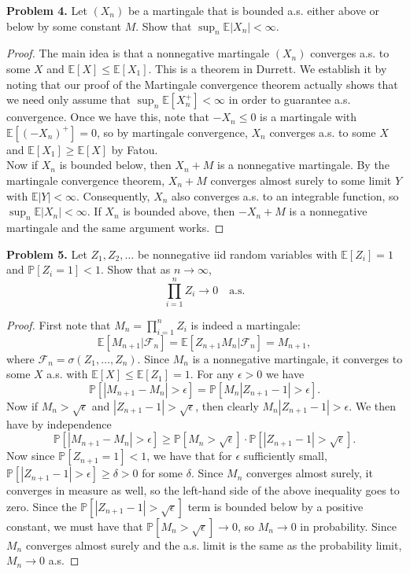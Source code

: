 \documentclass[11pt,letterpaper]{report}
\newcommand{\mcal}[1]{\mathcal{#1}}
\newcommand{\E}{\mathbb{E}}
\newcommand{\Prob}{\mathbb{P}}
\begin{document}
\noindent\textbf{Problem 4. }
Let $(X_n)$ be a martingale that is bounded a.s. either above or below by some constant $M$. Show that $\sup_n \E|X_n|<\infty$.
\begin{proof}
	The main idea is that a nonnegative martingale $(X_n)$ converges a.s. to some $X$ and $\E[X]\leq \E[X_1]$. This is a theorem in Durrett. We establish it by noting that our proof of the Martingale convergence theorem actually shows that we need only assume that $\sup_n\E[X_n^+]<\infty$ in order to guarantee a.s. convergence. Once we have this, note that $-X_n \leq 0$ is a martingale with $\E[(-X_n)^+] = 0$, so by martingale convergence, $X_n$ converges a.s. to some $X$ and $\E[X_1] \geq \E[X]$ by Fatou.\\
	\noindent Now if $X_n$ is bounded below, then $X_n+M$ is a nonnegative martingale. By the martingale convergence theorem, $X_n+M$ converges almost surely to some limit $Y$ with $\E|Y|<\infty$. Consequently, $X_n$ also converges a.s. to an integrable function, so $\sup_n \E|X_n|<\infty$. If $X_n$ is bounded above, then $-X_n+M$ is a nonnegative martingale and the same argument works.
\end{proof}

\noindent\textbf{Problem 5. }
Let $Z_1, Z_2, \ldots$ be nonnegative iid random variables with $\E[Z_i] = 1$ and $\Prob[Z_i = 1]<1$. Show that as $n\to \infty$,
\[
\prod_{i=1}^n Z_i\to 0\quad\text{a.s.}
\]
\begin{proof}
	First note that $M_n = \prod_{i=1}^nZ_i$ is indeed a martingale:
	\[
	\E[M_{n+1}|\mcal{F}_n] = \E[Z_{n+1}M_n|\mcal{F}_n] = M_{n+1},
	\]
	where $\mcal{F}_n = \sigma(Z_1, \ldots, Z_n)$. Since $M_n$ is a nonnegative martingale, it converges to some $X$ a.s. with $\E[X] \leq \E[Z_1] = 1$. For any $\epsilon>0$ we have
	\[
	\Prob[|M_{n+1}-M_n| > \epsilon] = \Prob[M_n|Z_{n+1}-1|>\epsilon].
	\]
	Now if $M_n>\sqrt{\epsilon}$ and $|Z_{n+1}-1|>\sqrt{\epsilon}$, then clearly $M_n|Z_{n+1}-1|>\epsilon$. We then have by independence
	\[
	\Prob[|M_{n+1}-M_n|>\epsilon] \geq \Prob[M_n>\sqrt{\epsilon}]\cdot\Prob[|Z_{n+1}-1|>\sqrt{\epsilon}].
	\]
	Now since $\Prob[Z_{n+1} = 1]<1$, we have that for $\epsilon$ sufficiently small, $\Prob[|Z_{n+1}-1|>\epsilon] \geq \delta>0$ for some $\delta$. Since $M_n$ converges almost surely, it converges in measure as well, so the left-hand side of the above inequality goes to zero. Since the $\Prob[|Z_{n+1}-1|>\sqrt{\epsilon}]$ term is bounded below by a positive constant, we must have that $\Prob[M_n>\sqrt{\epsilon}]\to 0$, so $M_n\to 0$ in probability. Since $M_n$ converges almost surely and the a.s. limit is the same as the probability limit, $M_n\to 0$ a.s.
\end{proof}
\end{document}
